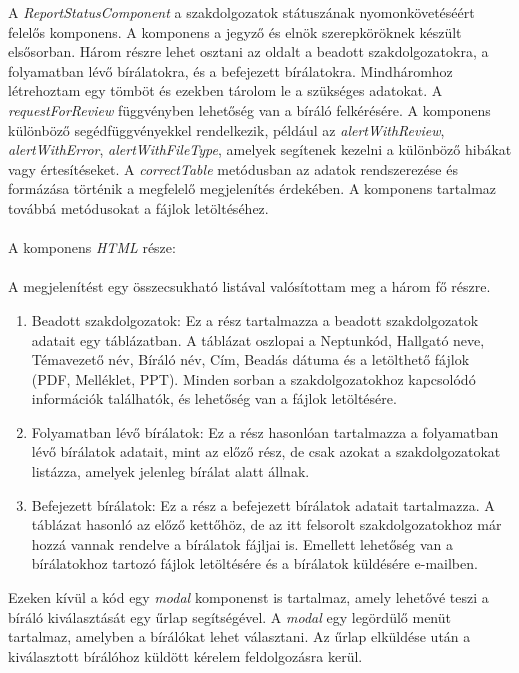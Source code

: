 A \textit{ReportStatusComponent} a szakdolgozatok státuszának nyomonkövetéséért felelős komponens. A komponens a jegyző és elnök szerepköröknek készült elsősorban. Három részre lehet osztani az oldalt a beadott szakdolgozatokra, a folyamatban lévő bírálatokra, és a befejezett bírálatokra. Mindháromhoz létrehoztam egy tömböt és ezekben tárolom le a szükséges adatokat. A \textit{requestForReview} függvényben lehetőség van a bíráló felkérésére. A komponens különböző segédfüggvényekkel rendelkezik, például az \textit{alertWithReview}, \textit{alertWithError}, \textit{alertWithFileType}, amelyek segítenek kezelni a különböző hibákat vagy értesítéseket. A \textit{correctTable} metódusban az adatok rendszerezése és formázása történik a megfelelő megjelenítés érdekében. A komponens tartalmaz továbbá metódusokat a fájlok letöltéséhez.\\
\\
A komponens \textit{HTML} része:\\
\\
A megjelenítést egy összecsukható listával valósítottam meg a három fő részre.
\\
\begin{enumerate}

\item{} Beadott szakdolgozatok: Ez a rész tartalmazza a beadott szakdolgozatok adatait egy táblázatban. A táblázat oszlopai a Neptunkód, Hallgató neve, Témavezető név, Bíráló név, Cím, Beadás dátuma és a letölthető fájlok (PDF, Melléklet, PPT). Minden sorban a szakdolgozatokhoz kapcsolódó információk találhatók, és lehetőség van a fájlok letöltésére.

\item{} Folyamatban lévő bírálatok: Ez a rész hasonlóan tartalmazza a folyamatban lévő bírálatok adatait, mint az előző rész, de csak azokat a szakdolgozatokat listázza, amelyek jelenleg bírálat alatt állnak.

\item{} Befejezett bírálatok: Ez a rész a befejezett bírálatok adatait tartalmazza. A táblázat hasonló az előző kettőhöz, de az itt felsorolt szakdolgozatokhoz már hozzá vannak rendelve a bírálatok fájljai is. Emellett lehetőség van a bírálatokhoz tartozó fájlok letöltésére és a bírálatok küldésére e-mailben.\\
\end{enumerate}
Ezeken kívül a kód egy \textit{modal} komponenst is tartalmaz, amely lehetővé teszi a bíráló kiválasztását egy űrlap segítségével. A \textit{modal} egy legördülő menüt tartalmaz, amelyben a bírálókat lehet választani. Az űrlap elküldése után a kiválasztott bírálóhoz küldött kérelem feldolgozásra kerül.

